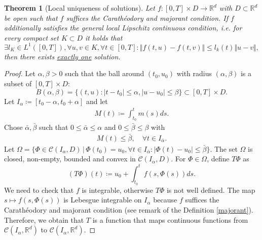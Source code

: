 \documentclass[a4paper, 11pt]{article}
\newtheorem{theorem}{Theorem}
\begin{document}
\begin{theorem}[Local uniqueness of solutions]
	Let $f: [0,T] \times D \to \mathbb R^d$ with $D \subset \mathbb R^d$ be open such that $f$ suffices the Carathéodory and majorant condition. If $f$ additionally satisfies the general local Lipschitz continuous condition, i.e. for every compact set $K \subset D$ it holds that
	\[
	\exists l_K \in L^1([0,T]), \forall u,v \in K, \forall t \in [0,T]: \Vert f(t,u) - f(t,v) \Vert \leq l_k(t) \Vert u-v \Vert,
	\]
	then there exists \underline{exactly one} solution.
\end{theorem}
\begin{proof}
	Let $\alpha, \beta > 0$ such that the ball around $(t_0, u_0)$ with radius $(\alpha, \beta)$ is a subset of $[0,T] \times D$:
	\[
	B(\alpha, \beta) = \{ (t,u) : |t-t_0| \leq \alpha, |u-u_0| \leq \beta \} \subset [0,T] \times D.
	\]
	Let $I_{\alpha} \coloneqq [t_0-\alpha, t_0 + \alpha]$ and let
	\begin{align}\label{dota}
	M(t) \coloneqq \int^t_{t_0}m(s)ds.
	\end{align}
	Chose $\bar \alpha, \bar \beta$ such that $0 \leq \bar \alpha \leq \alpha$ and $0 \leq \bar \beta \leq \beta$ with
	\begin{align}\label{sterne}
	M(t) \leq \bar \beta, \quad \forall t \in I_{\bar \alpha}.
	\end{align}
	Let $\Omega = \{ \Phi \in \mathcal C(I_{\alpha}, D) \, | \, \Phi(t_0) = u_0, \forall t \in I_{\bar \alpha} :|\Phi(t)-u_0| \leq \bar \beta \}$. The set $\Omega$ is closed, non-empty, bounded and convex in $\mathcal C(I_{\alpha}, D)$. For $\Phi \in \Omega$, define $T\Phi$ as
	\[
	(T\Phi)(t) \coloneqq u_0  + \int^t_{t_0}f(s, \Phi(s))ds.
	\]
	We need to check that $f$ is integrable, otherwise $T\Phi$ is not well defined. The map $s \mapsto f(s, \Phi(s))$ is Lebesgue integrable on $I_{\alpha}$ because $f$ suffices the Carathéodory and majorant condition (see remark of the Definition \ref{majorant}). Therefore, we obtain that $T$ is a function that maps continuous functions from $\mathcal C(I_{\alpha},\mathbb R^d)$ to $\mathcal C(I_{\alpha}, \mathbb R^d)$.
	

\end{proof}
\end{document}
